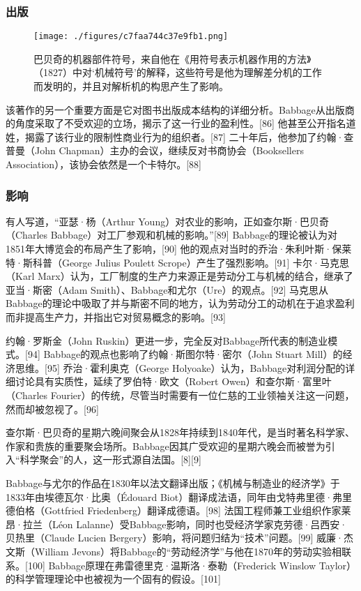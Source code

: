 \subsubsection{出版}  
\begin{figure}[ht]
\centering
\texttt{[image: ./figures/c7faa744c37e9fb1.png]}
\caption{巴贝奇的机器部件符号，来自他在《用符号表示机器作用的方法》（1827）中对‘机械符号’的解释，这些符号是他为理解差分机的工作而发明的，并且对解析机的构思产生了影响。} \label{fig_CRSBQ_4}
\end{figure}
该著作的另一个重要方面是它对图书出版成本结构的详细分析。Babbage从出版商的角度采取了不受欢迎的立场，揭示了这一行业的盈利性。[86] 他甚至公开指名道姓，揭露了该行业的限制性商业行为的组织者。[87] 二十年后，他参加了约翰·查普曼（John Chapman）主办的会议，继续反对书商协会（Booksellers Association），该协会依然是一个卡特尔。[88]
\subsubsection{影响}  
有人写道，“亚瑟·杨（Arthur Young）对农业的影响，正如查尔斯·巴贝奇（Charles Babbage）对工厂参观和机械的影响。”[89] Babbage的理论被认为对1851年大博览会的布局产生了影响，[90] 他的观点对当时的乔治·朱利叶斯·保莱特·斯科普（George Julius Poulett Scrope）产生了强烈影响。[91] 卡尔·马克思（Karl Marx）认为，工厂制度的生产力来源正是劳动分工与机械的结合，继承了亚当·斯密（Adam Smith）、Babbage和尤尔（Ure）的观点。[92] 马克思从Babbage的理论中吸取了并与斯密不同的地方，认为劳动分工的动机在于追求盈利而非提高生产力，并指出它对贸易概念的影响。[93]

约翰·罗斯金（John Ruskin）更进一步，完全反对Babbage所代表的制造业模式。[94] Babbage的观点也影响了约翰·斯图尔特·密尔（John Stuart Mill）的经济思维。[95] 乔治·霍利奥克（George Holyoake）认为，Babbage对利润分配的详细讨论具有实质性，延续了罗伯特·欧文（Robert Owen）和查尔斯·富里叶（Charles Fourier）的传统，尽管当时需要有一位仁慈的工业领袖关注这一问题，然而却被忽视了。[96]

查尔斯·巴贝奇的星期六晚间聚会从1828年持续到1840年代，是当时著名科学家、作家和贵族的重要聚会场所。Babbage因其广受欢迎的星期六晚会而被誉为引入“科学聚会”的人，这一形式源自法国。[8][9]

Babbage与尤尔的作品在1830年以法文翻译出版；《机械与制造业的经济学》于1833年由埃德瓦尔·比奥（Édouard Biot）翻译成法语，同年由戈特弗里德·弗里德伯格（Gottfried Friedenberg）翻译成德语。[98] 法国工程师兼工业组织作家莱昂·拉兰（Léon Lalanne）受Babbage影响，同时也受经济学家克劳德·吕西安·贝热里（Claude Lucien Bergery）影响，将问题归结为“技术”问题。[99] 威廉·杰文斯（William Jevons）将Babbage的“劳动经济学”与他在1870年的劳动实验相联系。[100] Babbage原理在弗雷德里克·温斯洛·泰勒（Frederick Winslow Taylor）的科学管理理论中也被视为一个固有的假设。[101]

